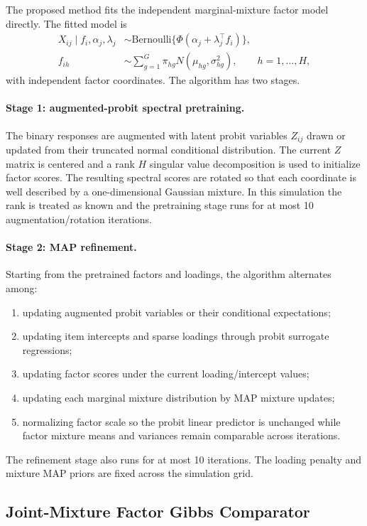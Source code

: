 \documentclass[11pt]{article}
\begin{document}
The proposed method fits the independent marginal-mixture factor model directly. The fitted model
is
\begin{align}
X_{ij} \mid f_i,\alpha_j,\lambda_j
  &\sim \mathrm{Bernoulli}\{\Phi(\alpha_j+\lambda_j^\top f_i)\}, \\
f_{ih} &\sim \sum_{g=1}^{G} \pi_{hg} N(\mu_{hg},\sigma_{hg}^2),
        \qquad h=1,\ldots,H,
\end{align}
with independent factor coordinates. The algorithm has two stages.

\paragraph{Stage 1: augmented-probit spectral pretraining.}
The binary responses are augmented with latent probit variables $Z_{ij}$ drawn or updated from
their truncated normal conditional distribution. The current $Z$ matrix is centered and a rank
$H$ singular value decomposition is used to initialize factor scores. The resulting spectral
scores are rotated so that each coordinate is well described by a one-dimensional Gaussian
mixture. In this simulation the rank is treated as known and the pretraining stage runs for at
most 10 augmentation/rotation iterations.

\paragraph{Stage 2: MAP refinement.}
Starting from the pretrained factors and loadings, the algorithm alternates among:
\begin{enumerate}[leftmargin=*]
  \item updating augmented probit variables or their conditional expectations;
  \item updating item intercepts and sparse loadings through probit surrogate regressions;
  \item updating factor scores under the current loading/intercept values;
  \item updating each marginal mixture distribution by MAP mixture updates;
  \item normalizing factor scale so the probit linear predictor is unchanged while factor
        mixture means and variances remain comparable across iterations.
\end{enumerate}
The refinement stage also runs for at most 10 iterations. The loading penalty and mixture MAP
priors are fixed across the simulation grid.

\subsection{Joint-Mixture Factor Gibbs Comparator}
\end{document}
